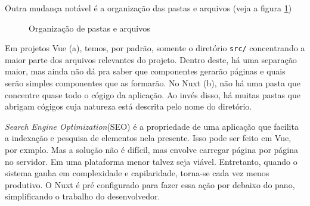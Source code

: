 Outra mudança notável é a organização das pastas e arquivos (veja a figura \ref{fig:file-system})

\begin{figure}[htb]
    \centering
    \caption{Organização de pastas e arquivos}
    \label{fig:file-system}
\end{figure}

Em projetos Vue (a), temos, por padrão, somente o diretório \texttt{src/} concentrando a maior parte
dos arquivos relevantes do projeto. Dentro deste, há uma separação maior, mas ainda não dá pra saber
que componentes gerarão páginas e quais serão simples componentes que as formarão. No Nuxt (b), não
há uma pasta que concentre quase todo o cógigo da aplicação. Ao invés disso, há muitas pastas que
abrigam cógigos cuja natureza está descrita pelo nome do diretório.

\emph{Search Engine Optimization}(SEO) é a propriedade de uma aplicação que facilita a  indexação e
pesquisa de elementos nela presente. Isso pode ser feito em Vue, por exmplo. Mas a solução não é
difícil, mas envolve carregar página por página no servidor. Em uma plataforma menor talvez seja
viável. Entretanto, quando o sistema ganha em complexidade e capilaridade, torna-se cada vez menos
produtivo. O Nuxt é pré configurado para fazer essa ação por debaixo do pano, simplificando o
trabalho do desenvolvedor.

